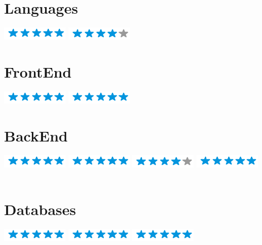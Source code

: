 \documentclass[american]{cv-class}
\begin{document}
\begin{aside}
	\section{Languages}
	{\includegraphics[scale=0.40]{img/5stars.png}}
	{\includegraphics[scale=0.40]{img/4stars.png}}
	~
	
	\section{FrontEnd}
	{\includegraphics[scale=0.40]{img/5stars.png}}
	{\includegraphics[scale=0.40]{img/5stars.png}}
	~
	
	\section{BackEnd}
	{\includegraphics[scale=0.40]{img/5stars.png}}
	{\includegraphics[scale=0.40]{img/5stars.png}}
	{\includegraphics[scale=0.40]{img/4stars.png}}
	{\includegraphics[scale=0.40]{img/5stars.png}}
	~
	
	\section{Databases}
	{\includegraphics[scale=0.40]{img/5stars.png}}
	{\includegraphics[scale=0.40]{img/5stars.png}}
	{\includegraphics[scale=0.40]{img/5stars.png}}
	
\end{aside}
\end{document}
